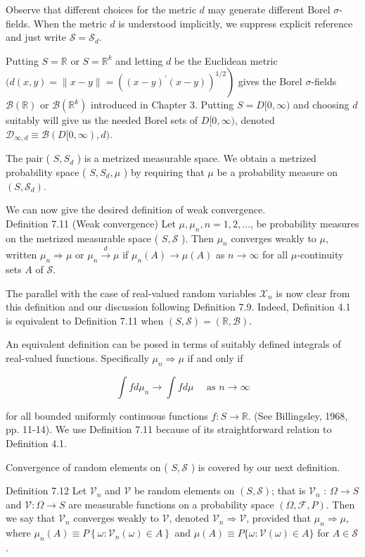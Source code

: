 \documentclass[10pt]{article}
\begin{document}
Observe that different choices for the metric $d$ may generate different Borel $\sigma$-fields. When the metric $d$ is understood implicitly, we suppress explicit reference and just write $\mathcal{S}=\mathcal{S}_{d}$.

Putting $S=\mathbb{R}$ or $S=\mathbb{R}^{k}$ and letting $d$ be the Euclidean metric $(d(x, y)= \left.\|x-y\|=\left((x-y)^{\prime}(x-y)\right)^{1 / 2}\right)$ gives the Borel $\sigma$-fields $\mathcal{B}(\mathbb{R})$ or $\mathcal{B}\left(\mathbb{R}^{k}\right)$ introduced in Chapter 3. Putting $S=D[0, \infty)$ and choosing $d$ suitably will give us the needed Borel sets of $D[0, \infty)$, denoted $\mathcal{D}_{\infty, d} \equiv \mathcal{B}(D[0, \infty), d)$.

The pair ( $S, S_{d}$ ) is a metrized measurable space. We obtain a metrized probability space ( $S, S_{d}, \mu$ ) by requiring that $\mu$ be a probability measure on $\left(S, \mathcal{S}_{d}\right)$.

We can now give the desired definition of weak convergence.\\
Definition 7.11 (Weak convergence) Let $\mu, \mu_{n}, n=1,2, \ldots$, be probability measures on the metrized measurable space ( $S, \mathcal{S}$ ). Then $\mu_{n}$ converges weakly to $\mu$, written $\mu_{n} \Rightarrow \mu$ or $\mu_{n} \xrightarrow{d} \mu$ if $\mu_{n}(A) \rightarrow \mu(A)$ as $n \rightarrow \infty$ for all $\mu$-continuity sets $A$ of $\mathcal{S}$.

The parallel with the case of real-valued random variables $\mathcal{X}_{n}$ is now clear from this definition and our discussion following Definition 7.9. Indeed, Definition 4.1 is equivalent to Definition 7.11 when $(S, \mathcal{S})=(\mathbb{R}, \mathcal{B})$.

An equivalent definition can be posed in terms of suitably defined integrals of real-valued functions. Specifically $\mu_{n} \Rightarrow \mu$ if and only if

$$
\int f d \mu_{n} \rightarrow \int f d \mu \quad \text { as } n \rightarrow \infty
$$

for all bounded uniformly continuous functions $f: S \rightarrow \mathbb{R}$. (See Billingsley, 1968, pp. 11-14). We use Definition 7.11 because of its straightforward relation to Definition 4.1.

Convergence of random elements on ( $S, \mathcal{S}$ ) is covered by our next definition.

Definition 7.12 Let $\mathcal{V}_{n}$ and $\mathcal{V}$ be random elements on $(S, \mathcal{S})$; that is $\mathcal{V}_{n}$ : $\Omega \rightarrow S$ and $\mathcal{V}: \Omega \rightarrow S$ are measurable functions on a probability space $(\Omega, \mathcal{F}, P)$. Then we say that $\mathcal{V}_{n}$ converges weakly to $\mathcal{V}$, denoted $\mathcal{V}_{n} \Rightarrow \mathcal{V}$, provided that $\mu_{n} \Rightarrow \mu$, where $\mu_{n}(A) \equiv P\left\{\omega: \mathcal{V}_{n}(\omega) \in A\right\}$ and $\mu(A) \equiv P\{\omega: \mathcal{V}(\omega) \in A\}$ for $A \in \mathcal{S}$.
\end{document}
